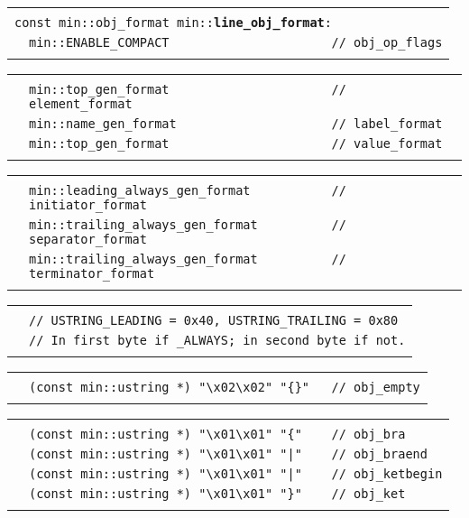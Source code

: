 \documentclass[12pt]{article}
\makeatletter
\newcommand{\TT}[1]{{\tt \bfseries #1}}
\newcommand{\ttindex}[1]{\index{#1@{\tt #1}}}
\newenvironment{indpar}[1][0.3in]%
	{\begin{list}{}%
		     {\setlength{\itemsep}{0in}%
		      \setlength{\topsep}{0in}%
		      \setlength{\parsep}{1ex}%
		      \setlength{\labelwidth}{#1}%
		      \setlength{\leftmargin}{#1}%
		      \addtolength{\leftmargin}{\labelsep}}%
	 \item}%
	{\end{list}}
\newcommand{\LABEL}[1]{\label{#1}}
\newlength{\ARGBREAKLENGTH}
\newcommand{\ARGBREAK}[1][\ARGBREAKLENGTH]{\\&\hspace*{#1}}
\newcommand{\MINKEY}[1]%
	   {\TT{#1}\ttindex{min::#1}\ttindex{#1}}
\makeatother
\begin{document}
\begin{indpar}[1em]
\begin{tabular}{r@{}l}\hspace*{0.1in} \\[-3ex]
\multicolumn{2}{l}{\tt const min::obj\_format
                   min::\MINKEY{line\_obj\_format}:}%
\LABEL{MIN::LINE_OBJ_FORMAT}\ARGBREAK
\verb|min::ENABLE_COMPACT                      // obj_op_flags|\ARGBREAK
\end{tabular}

\vspace{-4ex}\begin{tabular}{r@{}l}\hspace*{0.1in}\ARGBREAK
\verb|min::top_gen_format                      // element_format|\ARGBREAK
\verb|min::name_gen_format                     // label_format|\ARGBREAK
\verb|min::top_gen_format                      // value_format|\ARGBREAK
\end{tabular}

\vspace{-4ex}\begin{tabular}{r@{}l}\hspace*{0.1in}\ARGBREAK
\verb|min::leading_always_gen_format           // initiator_format|\ARGBREAK
\verb|min::trailing_always_gen_format          // separator_format|\ARGBREAK
\verb|min::trailing_always_gen_format          // terminator_format|\ARGBREAK
\end{tabular}

\vspace{-4ex}\begin{tabular}{r@{}l}\hspace*{0.1in}\ARGBREAK
\verb|// USTRING_LEADING = 0x40, USTRING_TRAILING = 0x80|\ARGBREAK
\verb|// In first byte if _ALWAYS; in second byte if not.|\ARGBREAK
\end{tabular}

\vspace{-4ex}\begin{tabular}{r@{}l}\hspace*{0.1in}\ARGBREAK
\verb|(const min::ustring *) "\x02\x02" "{}"   // obj_empty|\ARGBREAK
\end{tabular}

\vspace{-4ex}\begin{tabular}{r@{}l}\hspace*{0.1in}\ARGBREAK
\verb|(const min::ustring *) "\x01\x01" "{"    // obj_bra|\ARGBREAK
\verb$(const min::ustring *) "\x01\x01" "|"    // obj_braend$\ARGBREAK
\verb$(const min::ustring *) "\x01\x01" "|"    // obj_ketbegin$\ARGBREAK
\verb|(const min::ustring *) "\x01\x01" "}"    // obj_ket|\ARGBREAK
\end{tabular}


\end{indpar}
\end{document}
